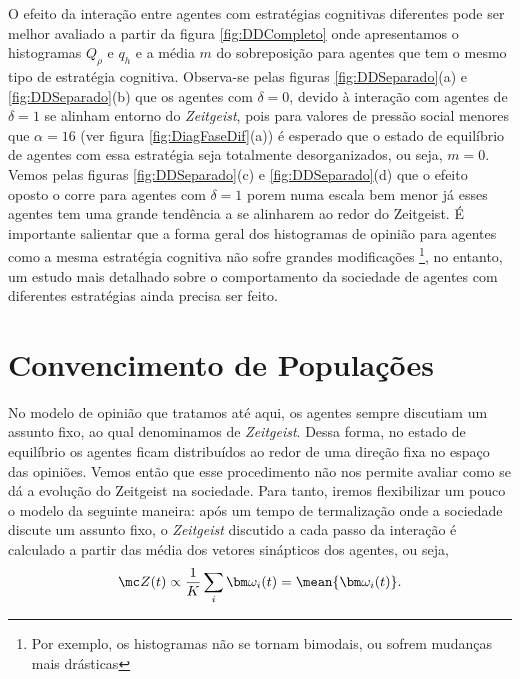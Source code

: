 O efeito da interação entre agentes com estratégias cognitivas diferentes
pode ser melhor avaliado a partir da figura \ref{fig:DDCompleto} onde
apresentamos o histogramas $Q_\rho$ e $q_h$ e a média $m$ do sobreposição
para agentes que tem o mesmo tipo de estratégia cognitiva. Observa-se pelas
figuras \ref{fig:DDSeparado}(a) e \ref{fig:DDSeparado}(b) que os agentes com
$\delta = 0$, devido à interação com agentes  de $\delta = 1$ se alinham
entorno do \textit{Zeitgeist}, pois para valores de pressão social menores
que $\alpha = 16$ (ver figura \ref{fig:DiagFaseDif}(a))
 é esperado que o estado de equilíbrio de agentes com essa estratégia
 seja totalmente desorganizados, ou seja, $m=0$. Vemos pelas figuras
\ref{fig:DDSeparado}(c) e \ref{fig:DDSeparado}(d) que o efeito oposto o corre
para agentes com $\delta = 1$ porem numa escala bem menor já esses agentes
tem uma grande tendência a se alinharem ao redor do Zeitgeist. É importante
salientar que a forma geral dos histogramas de opinião para agentes como a
mesma estratégia cognitiva não sofre grandes modificações \footnote{Por
exemplo, os histogramas não se tornam bimodais, ou sofrem mudanças mais
drásticas}, no entanto, um estudo mais detalhado sobre o comportamento da
sociedade de agentes com diferentes estratégias ainda precisa ser feito.

\newpage
\section{Convencimento de Populações} %

No modelo de opinião que tratamos até aqui, os agentes sempre discutiam
um assunto fixo, ao qual denominamos de \textit{Zeitgeist}. Dessa forma,
no estado de equilíbrio os agentes ficam distribuídos ao redor de uma
direção fixa no espaço das opiniões. Vemos então que  esse procedimento
não nos permite avaliar como se dá a evolução do Zeitgeist na sociedade.
Para tanto, iremos flexibilizar um pouco o modelo da seguinte maneira:
após um tempo de termalização onde a sociedade discute um assunto fixo,
o \textit{Zeitgeist} discutido a cada passo da interação é calculado a partir
das média dos vetores sinápticos dos  agentes, ou seja,
\[
 \mc Z(t) \propto \frac{1}{K}\sum_i \bm \omega_i(t) = \mean{\bm \omega_i(t)}.
\]

